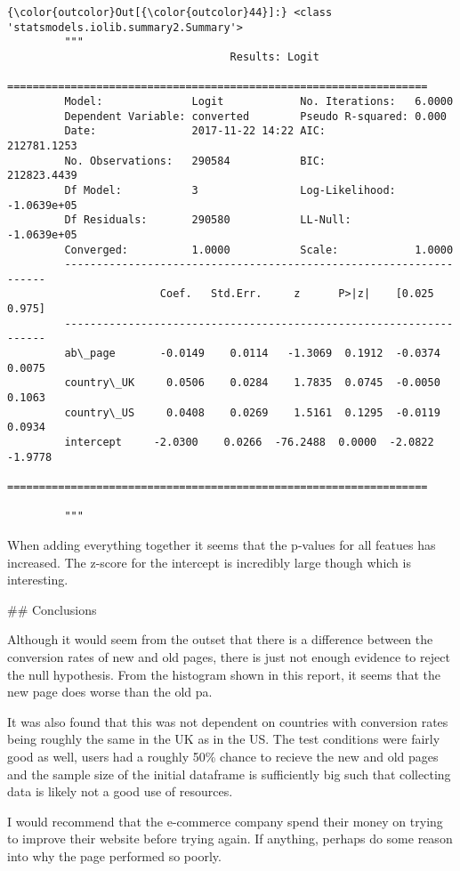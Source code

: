 \documentclass[11pt]{article}
\begin{document}
\begin{Verbatim}[commandchars=\\\{\}]
{\color{outcolor}Out[{\color{outcolor}44}]:} <class 'statsmodels.iolib.summary2.Summary'>
         """
                                   Results: Logit
         ==================================================================
         Model:              Logit            No. Iterations:   6.0000     
         Dependent Variable: converted        Pseudo R-squared: 0.000      
         Date:               2017-11-22 14:22 AIC:              212781.1253
         No. Observations:   290584           BIC:              212823.4439
         Df Model:           3                Log-Likelihood:   -1.0639e+05
         Df Residuals:       290580           LL-Null:          -1.0639e+05
         Converged:          1.0000           Scale:            1.0000     
         -------------------------------------------------------------------
                        Coef.   Std.Err.     z      P>|z|    [0.025   0.975]
         -------------------------------------------------------------------
         ab\_page       -0.0149    0.0114   -1.3069  0.1912  -0.0374   0.0075
         country\_UK     0.0506    0.0284    1.7835  0.0745  -0.0050   0.1063
         country\_US     0.0408    0.0269    1.5161  0.1295  -0.0119   0.0934
         intercept     -2.0300    0.0266  -76.2488  0.0000  -2.0822  -1.9778
         ==================================================================
         
         """
\end{Verbatim}
            
    When adding everything together it seems that the p-values for all
featues has increased. The z-score for the intercept is incredibly large
though which is interesting.

     \#\# Conclusions

    Although it would seem from the outset that there is a difference
between the conversion rates of new and old pages, there is just not
enough evidence to reject the null hypothesis. From the histogram shown
in this report, it seems that the new page does worse than the old pa.

It was also found that this was not dependent on countries with
conversion rates being roughly the same in the UK as in the US. The test
conditions were fairly good as well, users had a roughly 50\% chance to
recieve the new and old pages and the sample size of the initial
dataframe is sufficiently big such that collecting data is likely not a
good use of resources.

I would recommend that the e-commerce company spend their money on
trying to improve their website before trying again. If anything,
perhaps do some reason into why the page performed so poorly.


    
    
    
    
\end{document}
